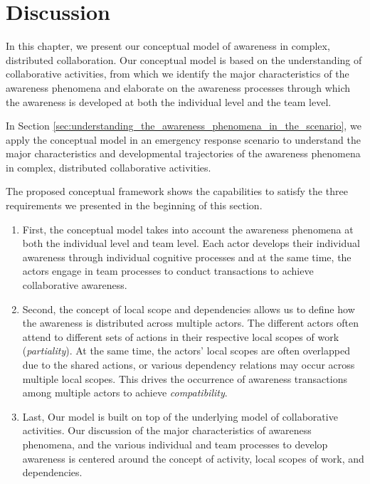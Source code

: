 \section{Discussion} %
\label{sec:discussion}
In this chapter, we present our conceptual model of awareness in complex, distributed collaboration. Our conceptual model is based on the understanding of collaborative activities, from which we identify the major characteristics of the awareness phenomena and elaborate on the awareness processes through which the awareness is developed at both the individual level and the team level.

In Section \ref{sec:understanding_the_awareness_phenomena_in_the_scenario}, we apply the conceptual model in an emergency response scenario to understand the major characteristics and developmental trajectories of the awareness phenomena in complex, distributed collaborative activities. 

The proposed conceptual framework shows the capabilities to satisfy the three requirements we presented in the beginning of this section.
\begin{enumerate}
	\item First, the conceptual model takes into account the awareness phenomena at both the individual level and team level. Each actor develops their individual awareness through individual cognitive processes and at the same time, the actors engage in team processes to conduct transactions to achieve collaborative awareness.  
	\item Second, the concept of local scope and dependencies allows us to define how the awareness is distributed across multiple actors. The different actors often attend to different sets of actions in their respective local scopes of work (\emph{partiality}). At the same time, the actors' local scopes are often overlapped due to the shared actions, or various dependency relations may occur across multiple local scopes. This drives the occurrence of awareness transactions among multiple actors to achieve \emph{compatibility}.
	\item Last, Our model is built on top of the underlying model of collaborative activities. Our discussion of the major characteristics of awareness phenomena, and the various individual and team processes to develop awareness is centered around the concept of activity, local scopes of work, and dependencies.
\end{enumerate}




 


